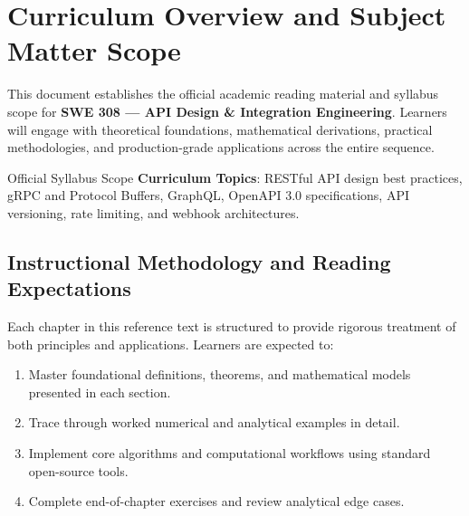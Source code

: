 \section{Curriculum Overview and Subject Matter Scope}

This document establishes the official academic reading material and syllabus scope for \textbf{SWE 308 --- API Design \& Integration Engineering}. Learners will engage with theoretical foundations, mathematical derivations, practical methodologies, and production-grade applications across the entire sequence.

\begin{InsightBox}{Official Syllabus Scope}
  \textbf{Curriculum Topics}: RESTful API design best practices, gRPC and Protocol Buffers, GraphQL, OpenAPI 3.0 specifications, API versioning, rate limiting, and webhook architectures.
\end{InsightBox}

\subsection{Instructional Methodology and Reading Expectations}

Each chapter in this reference text is structured to provide rigorous treatment of both principles and applications. Learners are expected to:
\begin{enumerate}
  \item Master foundational definitions, theorems, and mathematical models presented in each section.
  \item Trace through worked numerical and analytical examples in detail.
  \item Implement core algorithms and computational workflows using standard open-source tools.
  \item Complete end-of-chapter exercises and review analytical edge cases.
\end{enumerate}


